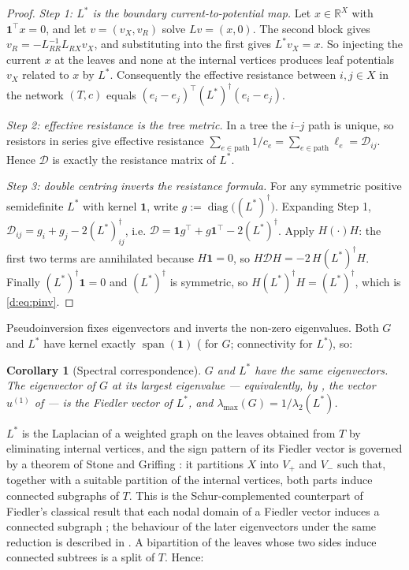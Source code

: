 \documentclass[11pt]{article}
\theoremstyle{plain}
\newtheorem{corollary}{Corollary}
\theoremstyle{definition}
\theoremstyle{remark}
\providecommand{\Dmat}{\mathcal{D}}          %
\providecommand{\uone}{u^{(1)}}
\providecommand{\1}{\mathbf{1}}
\providecommand{\R}{\mathbb{R}}
\begin{document}
\begin{proof}
\emph{Step 1: $L^{*}$ is the boundary current-to-potential map.} Let
$x\in\R^{X}$ with $\1^\top x=0$, and let $v=(v_X,v_R)$ solve $Lv=(x,0)$. The
second block gives $v_R=-L_{RR}^{-1}L_{RX}v_X$, and substituting into the first
gives $L^{*}v_X=x$. So injecting the current $x$ at the leaves and none at the
internal vertices produces leaf potentials $v_X$ related to $x$ by $L^{*}$.
Consequently the effective resistance between $i,j\in X$ in the network $(T,c)$
equals $(e_i-e_j)^\top (L^{*})^{\dagger}(e_i-e_j)$.

\emph{Step 2: effective resistance is the tree metric.} In a tree the $i$--$j$
path is unique, so resistors in series give effective resistance
$\sum_{e\in\text{path}}1/c_e=\sum_{e\in\text{path}}\ell_e=\Dmat_{ij}$. Hence
$\Dmat$ is exactly the resistance matrix of $L^{*}$.

\emph{Step 3: double centring inverts the resistance formula.} For any
symmetric positive semidefinite $L^{*}$ with kernel $\1$, write
$g:=\operatorname{diag}\bigl((L^{*})^{\dagger}\bigr)$. Expanding Step 1,
$\Dmat_{ij}=g_i+g_j-2(L^{*})^{\dagger}_{ij}$, i.e.
$\Dmat=\1g^\top+g\1^\top-2(L^{*})^{\dagger}$. Apply $H(\cdot)H$: the first two
terms are annihilated because $H\1=0$, so
$H\Dmat H=-2\,H(L^{*})^{\dagger}H$. Finally $(L^{*})^{\dagger}\1=0$ and
$(L^{*})^{\dagger}$ is symmetric, so $H(L^{*})^{\dagger}H=(L^{*})^{\dagger}$,
which is \eqref{d:eq:pinv}.
\end{proof}

Pseudoinversion fixes eigenvectors and inverts the non-zero eigenvalues.
Both $G$ and $L^{*}$ have kernel exactly $\operatorname{span}(\1)$
( for $G$; connectivity for $L^{*}$), so:

\begin{corollary}[Spectral correspondence]\label{d:cor:corr}
$G$ and $L^{*}$ have the same eigenvectors. The eigenvector of $G$ at its
largest eigenvalue --- equivalently, by , the vector $\uone$ of
 --- is the Fiedler vector of $L^{*}$, and
$\lambda_{\max}(G)=1/\lambda_2(L^{*})$.
\end{corollary}

$L^{*}$ is the Laplacian of a weighted graph on the leaves obtained from $T$ by
eliminating internal vertices, and the sign pattern of its Fiedler vector is
governed by a theorem of Stone and Griffing
\cite[Thm.~3.3]{stone2009fiedler}: it partitions $X$ into $V_+$ and $V_-$ such
that, together with a suitable partition of the internal vertices, both parts
induce connected subgraphs of $T$. This is the Schur-complemented counterpart of
Fiedler's classical result that each nodal domain of a Fiedler vector induces a
connected subgraph \cite{fiedler1975property}; the behaviour of the later
eigenvectors under the same reduction is described in
\cite{griffing2013interlacing}. A bipartition of the leaves whose two sides
induce connected subtrees is a split of $T$. Hence:
\end{document}
